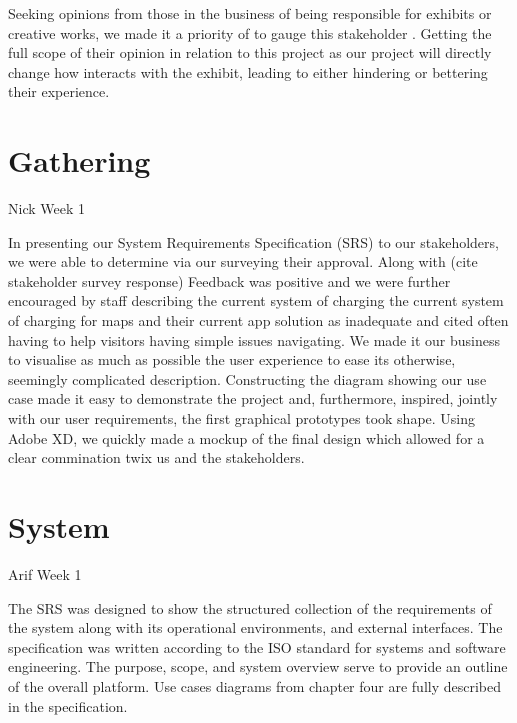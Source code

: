 Seeking opinions from those in the business of being responsible for exhibits or creative works, we made it a priority of to gauge this stakeholder . Getting the full scope of their opinion in relation to this project as our project will directly change how  interacts with the exhibit, leading to either hindering or bettering their experience. 


\section{Gathering}
Nick Week 1

In presenting our System Requirements Specification (SRS) to our stakeholders, we were able to determine via our surveying their approval. Along with (cite stakeholder survey response) Feedback was positive and we were further encouraged by staff describing the current system of charging the current system of charging for maps and their current app solution as inadequate and cited often having to help visitors having simple issues navigating. We made it our business to visualise as much as possible the user experience to ease its otherwise, seemingly complicated description. Constructing the diagram showing our use case made it easy to demonstrate the project and, furthermore, inspired, jointly with our user requirements, the first graphical prototypes took shape. Using Adobe XD, we quickly made a mockup of the final design which allowed for a clear commination twix us and the stakeholders. 

\section{System}
Arif Week 1

The SRS was designed to show the structured collection of the requirements of the system along with its operational environments, and external interfaces. The specification was written according to the ISO standard for systems and software engineering. The purpose, scope, and system overview serve to provide an outline of the overall platform. Use cases diagrams from chapter four are fully described in the specification.

